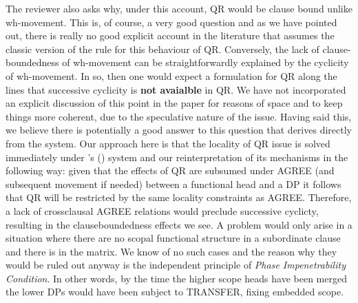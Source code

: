 \documentclass[11pt]{article}
\newcommand{\citeposs}[1]{\citeauthor{#1}'s (\citeyear{#1})}
\begin{document}
The reviewer also asks why, under this account, QR would be clause bound unlike wh-movement. This is, of course, a very good question and as we have pointed out, there is really no good explicit account in the literature that assumes the classic version of the rule for this behaviour of QR. Conversely, the lack of clause-boundedness of wh-movement can be straightforwardly explained by the cyclicity of wh-movement. In so, then one would expect a formulation for QR along the lines that successive cyclicity is \textbf{not avaialble} in QR. We have not incorporated an explicit discussion of this point in the paper for reasons of space and to keep things more coherent, due to the speculative nature of the issue. Having said this, we believe there is potentially a good answer to this question that derives directly from the system. Our approach here is that the locality of QR issue is solved immediately under \citeposs{beghelli-stowell:97} system and our reinterpretation of its mechanisms in the following way: given that the effects of QR are subsumed under AGREE (and subsequent movement if needed) between a functional head and a DP it follows that QR will be restricted by the same locality constraints as AGREE. Therefore, a lack of crossclausal AGREE relations would preclude successive cyclicty, resulting in the clauseboundedness effects we see. A problem would only arise in a situation where there are no scopal functional structure in a subordinate clause and there is in the matrix.  We know of no such cases and the reason why they would be ruled out anyway is the independent principle of \textit{Phase Impenetrability Condition}.  In other words, by the time the higher scope heads have been merged the lower DPs would have been subject to TRANSFER, fixing embedded scope.


\end{document}
